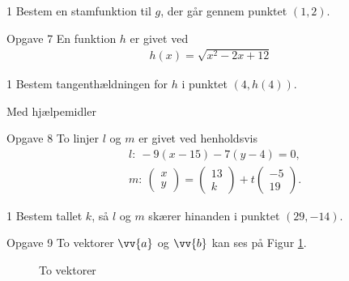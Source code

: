 %
%
\begin{delopgave}{1}
	Bestem en stamfunktion til $g$, der går gennem punktet $(1,2)$. 
\end{delopgave}
%
%
%
%
%
\begin{opgavetekst}{Opgave 7}
	En funktion $h$ er givet ved
	\begin{align*}
		h(x) = \sqrt{x^2 - 2x + 12}
	\end{align*}
\end{opgavetekst}
%
%
\begin{delopgave}{1}
	Bestem tangenthældningen for $h$ i punktet $(4,h(4))$. 
\end{delopgave}
%
%
%
%
%
\newpage
\begin{center}
	\Large
	Med hjælpemidler
\end{center}
%
%
\begin{opgavetekst}{Opgave 8}
	To linjer $l$ og $m$ er givet ved henholdsvis
	\begin{align*}
		&l: \ -9(x - 15) -7(y - 4) = 0, \\
		&m: \ 
		\begin{pmatrix}
			x \\ y	
		\end{pmatrix}
		=
		\begin{pmatrix}
			13 \\ k
		\end{pmatrix}
		+ t
		\begin{pmatrix}
			-5 \\ 19
		\end{pmatrix}.
	\end{align*}
\end{opgavetekst}
\begin{delopgave}{1}
	Bestem tallet $k$, så $l$ og $m$ skærer hinanden i punktet $(29,-14)$.
\end{delopgave}
%
%
%
%
%
\begin{opgavetekst}{Opgave 9}
	To vektorer $\vv{a}$ og $\vv{b}$ kan ses på Figur \ref{fig:proj}.
	\begin{figure}[H]
		\centering
		\caption{To vektorer}
		\label{fig:proj}
	\end{figure}
	\phantom{h}
\end{opgavetekst}
